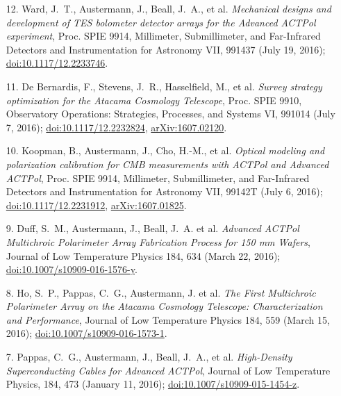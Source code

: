 \documentclass[margin,line]{res}
\begin{document}
\begin{resume}
\begin{enumerate}
{    ACTPol}, Proc. SPIE 9914, Millimeter, Submillimeter, and Far-Infrared Detectors
    and Instrumentation for Astronomy VII, 991416 (July 19, 2016);
    \href{http://dx.doi.org/10.1117/12.2233603}{doi:10.1117/12.2233603}.
\item[{12.}] Ward, J.~T., Austermann, J., Beall, J.~A., et al.
    \textit{Mechanical designs and development of TES bolometer detector arrays for
    the Advanced ACTPol experiment}, Proc. SPIE 9914, Millimeter, Submillimeter,
    and Far-Infrared Detectors and Instrumentation for Astronomy VII, 991437 (July
    19, 2016); \href{http://dx.doi.org/10.1117/12.2233746}{doi:10.1117/12.2233746}.
\item[{11.}] De Bernardis, F., Stevens, J.~R., Hasselfield, M., et al.
    \textit{Survey strategy optimization for the Atacama Cosmology Telescope},
    Proc. SPIE 9910, Observatory Operations: Strategies, Processes, and Systems
    VI, 991014 (July 7, 2016);
    \href{http://dx.doi.org/10.1117/12.2232824}{doi:10.1117/12.2232824},
    \href{https://arxiv.org/abs/1607.02120}{arXiv:1607.02120}.
\item[{10.}] Koopman, B., Austermann, J., Cho, H.-M., et al. \textit{Optical
    modeling and polarization calibration for CMB measurements with ACTPol and
    Advanced ACTPol}, Proc. SPIE 9914, Millimeter, Submillimeter, and Far-Infrared
    Detectors and Instrumentation for Astronomy VII, 99142T (July 6, 2016);
    \href{http://dx.doi.org/10.1117/12.2231912}{doi:10.1117/12.2231912},
    \href{https://arxiv.org/abs/1607.01825}{arXiv:1607.01825}.
\item[{9.}] Duff, S.~M., Austermann, J., Beall, J.~A. et al. \textit{Advanced
    ACTPol Multichroic Polarimeter Array Fabrication Process for 150 mm Wafers},
    Journal of Low Temperature Physics 184, 634 (March 22, 2016);
    \href{http://dx.doi.org/10.1007/s10909-016-1576-y}{doi:10.1007/s10909-016-1576-y}.
\item[{8.}] Ho, S.~P., Pappas, C.~G., Austermann, J. et al. \textit{The First
    Multichroic Polarimeter Array on the Atacama Cosmology Telescope:
    Characterization and Performance}, Journal of Low Temperature Physics 184, 559 (March 15, 2016);
    \href{http://dx.doi.org/10.1007/s10909-016-1573-1}{doi:10.1007/s10909-016-1573-1}.
\item[{7.}] Pappas, C.~G., Austermann, J., Beall, J.~A., et al.
    \textit{High-Density Superconducting Cables for Advanced ACTPol}, Journal of Low
    Temperature Physics, 184, 473 (January 11, 2016);
    \href{http://dx.doi.org/10.1007/s10909-015-1454-z}{doi:10.1007/s10909-015-1454-z}.

\end{enumerate}
\end{resume}
\end{document}
